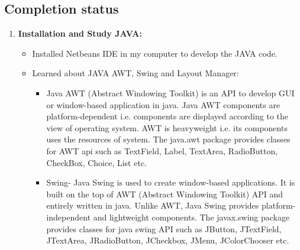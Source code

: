 \documentclass[a4paper,12pt,oneside]{book}
\begin{document}
\subsection*{Completion status}
\begin{enumerate}
	 	\item \textbf{\large Installation and Study JAVA:}
	 	\begin{itemize}
			\item Installed Netbeans IDE in my computer to develop the JAVA code.
			\item Learned about JAVA AWT, Swing and Layout Manager:
			\begin{itemize}
				\item Java AWT (Abstract Windowing Toolkit) is an API to develop GUI or window-based application in java. Java AWT components are platform-dependent i.e. components are displayed according to the view of operating system. AWT is heavyweight i.e. its components uses the resources of system. The java.awt package provides classes for AWT api such as TextField, Label, TextArea, RadioButton, CheckBox, Choice, List etc.
				\item Swing- Java Swing is used to create window-based applications. It is built on the top of AWT (Abstract Windowing Toolkit) API and entirely written in java. Unlike AWT, Java Swing provides platform-independent and lightweight components. The javax.swing package provides classes for java swing API such as JButton, JTextField, JTextArea, JRadioButton, JCheckbox, JMenu, JColorChooser etc.
				

\end{itemize}
\end{itemize}
\end{enumerate}
\end{document}
